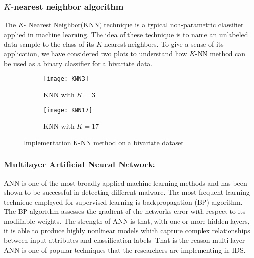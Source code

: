\documentclass{llncs}
\begin{document}
\subsubsection{$K$-nearest neighbor algorithm}
The $K$- Nearest Neighbor(KNN) technique is a typical non-parametric classifier applied in machine learning. The idea of these technique is to name an unlabeled data sample to the class of its $K$ nearest neighbors. To give a sense of its application, we have considered two plots to understand how $K$-NN method can be used as a binary classifier for a bivariate data.
\pagebreak
\begin{figure}[!h] 
\begin{subfigure}{.6\textwidth}
  \centering
  \texttt{[image: KNN3]}
  \captionsetup{font=scriptsize}
  \caption{KNN with $K=3$}
  \label{fig:sfig}
\end{subfigure}%
\begin{subfigure}{.6\textwidth}
  \centering
  \texttt{[image: KNN17]}
  \captionsetup{font=scriptsize}
  \caption{KNN with $K=17$}
  \label{fig:sfig_}
\end{subfigure}
\caption{Implementation K-NN method on a bivariate dataset\cite{KNN}}
 \label{fig:fig}
\end{figure}
\vspace{-0.8cm}
\subsubsection{Multilayer Artificial Neural Network:}
 ANN is one of the most broadly applied machine-learning methods and has been shown to be successful in detecting different malware. The most frequent learning technique employed for supervised learning is backpropagation (BP) algorithm. The BP algorithm assesses the gradient of the networks error with respect to its modifiable weights. The strength of ANN is that, with one or more hidden layers, it is able to produce highly nonlinear models which capture complex relationships between input attributes and classification labels\cite{survey}. That is the reason multi-layer ANN is one of popular techniques that the researchers are implementing in IDS.
\end{document}
